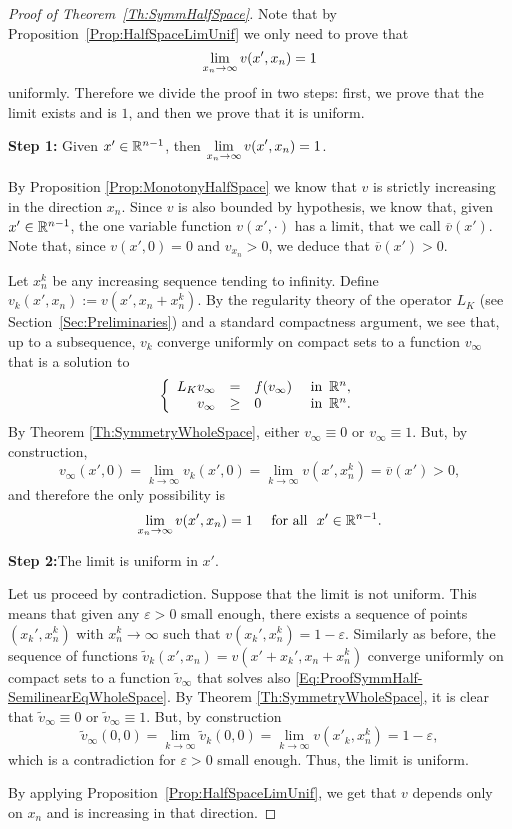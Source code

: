 \begin{proof}[Proof of Theorem~\ref{Th:SymmHalfSpace}]
Note that by Proposition~\ref{Prop:HalfSpaceLimUnif} we only need to prove that
$$
\displaystyle \lim_{x_n\to \infty} v(x',x_n) = 1
$$
uniformly. Therefore we divide the proof in two steps: first, we prove that the limit exists and is $1$, and then we prove that it is uniform.


\textbf{Step 1:} Given $x'\in \mathbb{R}^{n-1}$, then  $\displaystyle \lim_{x_n\to \infty} v(x',x_n) = 1$.

By Proposition \ref{Prop:MonotonyHalfSpace} we know that $v$ is strictly increasing in the direction $x_n$. Since $v$ is also bounded by hypothesis, we know that, given $x'\in\mathbb{R}^{n-1}$, the one variable function $v(x',\cdot)$ has a limit, that we call $\overline{v}(x')$. Note that, since $v(x',0) = 0$ and $v_{x_n}>0$, we deduce that $\overline{v}(x') > 0$.

Let $x_n^k$ be any increasing sequence tending to infinity. Define $v_k(x',x_n) := v(x',x_n+x_n^k)$. By the regularity theory of the operator $L_K $ (see Section~\ref{Sec:Preliminaries}) and a standard compactness argument, we see that, up to a subsequence, $v_k$ converge uniformly on compact sets to a function $v_\infty$ that is a solution to
\begin{equation}
\label{Eq:ProofSymmHalf-SemilinearEqWholeSpace}
\left\{\begin{array}{rcll}
L_K v_\infty &=& f(v_\infty)   &\textrm{ in } \,\mathbb{R}^n,\\
v_\infty &\geq& 0   &\textrm{ in } \,\mathbb{R}^n.
\end{array} \right.
\end{equation}
By Theorem \ref{Th:SymmetryWholeSpace}, either $v_\infty\equiv 0$ or $v_\infty \equiv 1$. But, by construction,
$$ v_\infty(x',0) = \lim_{k\to \infty} v_k(x',0) = \lim_{k\to \infty} v(x',x_n^k) = \overline{v}(x') > 0, $$
and therefore the only possibility is
$$ \lim_{x_n\to \infty} v(x',x_n) = 1 \quad \text{ for all } \ x'\in\mathbb{R}^{n-1}. $$

\textbf{Step 2:}The limit is uniform in $x'$.

Let us proceed by contradiction. Suppose that the limit is not uniform. This means that given any $\varepsilon>0$ small enough, there exists a sequence of points $(x_k',x_n^k)$ with $x_n^k\to \infty$ such that $v(x_k',x_n^k) = 1-\varepsilon$. Similarly as before, the sequence of functions $\tilde{v}_k(x',x_n) = v(x'+x_k',x_n+x_n^k)$ converge uniformly on compact sets to a function $\tilde{v}_\infty$ that solves also \eqref{Eq:ProofSymmHalf-SemilinearEqWholeSpace}. By Theorem \ref{Th:SymmetryWholeSpace}, it is clear that $\tilde{v}_\infty\equiv 0$ or $\tilde{v}_\infty \equiv 1$. But, by construction
$$ \tilde{v}_\infty(0,0) = \lim_{k\to \infty} \tilde{v}_k(0,0) = \lim_{k\to \infty} v(x'_k,x_n^k) = 1-\varepsilon, $$
which is a contradiction for $\varepsilon>0$ small enough. Thus, the limit is uniform.

By applying Proposition~\ref{Prop:HalfSpaceLimUnif}, we get that $v$ depends only on $x_n$ and is increasing in that direction.
\end{proof}
